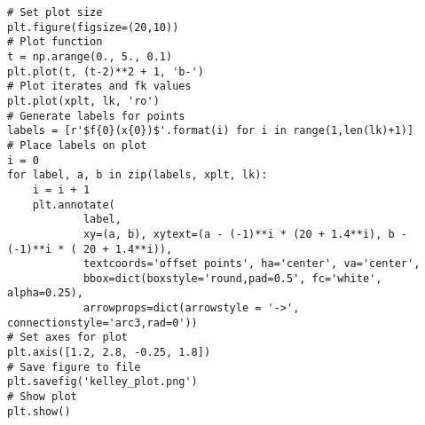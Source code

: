 \documentclass[11pt]{article}
\theoremstyle{definition}
\begin{document}
\begin{scriptsize}
\begin{verbatim}
# Set plot size
plt.figure(figsize=(20,10))
# Plot function
t = np.arange(0., 5., 0.1)
plt.plot(t, (t-2)**2 + 1, 'b-')
# Plot iterates and fk values
plt.plot(xplt, lk, 'ro')
# Generate labels for points
labels = [r'$f{0}(x{0})$'.format(i) for i in range(1,len(lk)+1)]
# Place labels on plot
i = 0
for label, a, b in zip(labels, xplt, lk):
    i = i + 1
    plt.annotate(
            label,
            xy=(a, b), xytext=(a - (-1)**i * (20 + 1.4**i), b - (-1)**i * ( 20 + 1.4**i)),
            textcoords='offset points', ha='center', va='center',
            bbox=dict(boxstyle='round,pad=0.5', fc='white', alpha=0.25),
            arrowprops=dict(arrowstyle = '->', connectionstyle='arc3,rad=0'))
# Set axes for plot
plt.axis([1.2, 2.8, -0.25, 1.8])
# Save figure to file
plt.savefig('kelley_plot.png')
# Show plot
plt.show()
\end{verbatim}
\end{scriptsize}
\end{document}
